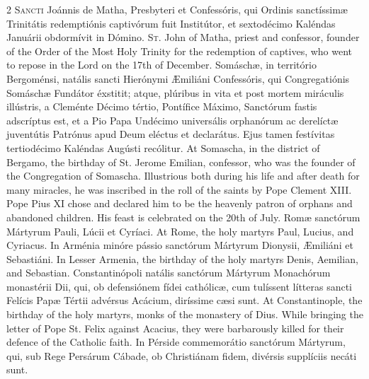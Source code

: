 \begin{paracol}{2}
\lettrine[lines=2]{S}{ancti} Joánnis de Matha, Presbyteri et Confessóris, qui Ordinis sanctíssimæ 
 Trinitátis redemptiónis captivórum fuit Institútor, et sextodécimo Kaléndas 
 Januárii obdormívit in Dómino.
\switchcolumn
{}
\lettrine[lines=2]{S}{t.} John of Matha, priest and confessor, founder of the Order of the Most 
 Holy Trinity for the redemption of captives, who went to repose in the Lord 
 on the 17th of December.
\switchcolumn*
{}
Somáschæ, in território Bergoménsi, natális 
 sancti Hierónymi Æmiliáni Confessóris, qui Congregatiónis Somáschæ Fundátor 
 éxstitit; atque, plúribus in vita et post mortem miráculis illústris, a 
 Cleménte Décimo tértio, Pontífice Máximo, Sanctórum fastis adscríptus est, 
 et a Pio Papa Undécimo universális orphanórum ac derelíctæ juventútis 
 Patrónus apud Deum eléctus et declarátus. Ejus tamen festívitas 
 tertiodécimo Kaléndas Augústi recólitur.
\switchcolumn
{}
At Somascha, in the district of Bergamo, the birthday of St. Jerome Emilian, 
 confessor, who was the founder of the Congregation of Somascha. 
 Illustrious both during his life and after death for many miracles, he was 
 inscribed in the roll of the saints by Pope Clement XIII. Pope Pius XI 
 chose and declared him to be the heavenly patron of orphans and abandoned 
 children. His feast is celebrated on the 20th of July.
\switchcolumn*
{}
Romæ sanctórum Mártyrum Pauli, Lúcii et Cyríaci.
\switchcolumn
{}
At Rome, the holy martyrs Paul, Lucius, and Cyriacus.
\switchcolumn*
{}
In Arménia minóre pássio sanctórum Mártyrum Dionysii,
 Æmiliáni et Sebastiáni.
\switchcolumn
{}
In Lesser Armenia, the birthday of the holy martyrs Denis, Aemilian, and 
 Sebastian.
\switchcolumn*
{}
Constantinópoli natális sanctórum Mártyrum Monachórum monastérii Dii, 
 qui, ob defensiónem fídei cathólicæ, cum 
 tulíssent lítteras sancti Felícis Papæ Tértii advérsus Acácium, diríssime 
 cæsi sunt.
\switchcolumn
{}
At Constantinople, the birthday of the holy martyrs, monks of the monastery 
 of Dius. While bringing the letter of Pope St. Felix against Acacius, 
 they were barbarously killed for their defence of the Catholic faith.
\switchcolumn*
{}
In Pérside commemorátio sanctórum Mártyrum, qui, sub Rege Persárum Cábade, 
 ob Christiánam fidem, divérsis supplíciis necáti sunt.
\switchcolumn
{}

\end{paracol}
